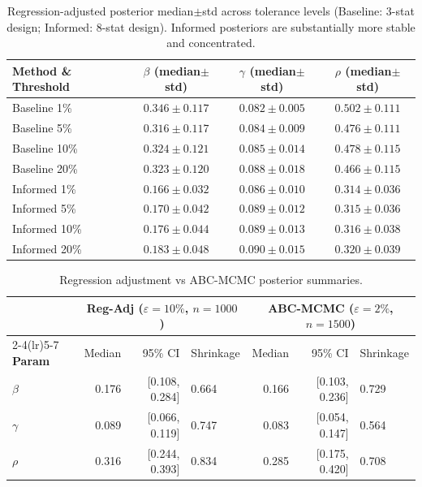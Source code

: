 \documentclass[12pt]{article}
\begin{document}
\begin{table}[h]
\centering
\small
\begin{tabular}{lccc}
\toprule
\textbf{Method \& Threshold} & \textbf{$\beta$ (median$\pm$std)} & \textbf{$\gamma$ (median$\pm$std)} & \textbf{$\rho$ (median$\pm$std)} \\
\midrule
Baseline 1\%  & $0.346\pm0.117$ & $0.082\pm0.005$ & $0.502\pm0.111$ \\
Baseline 5\%  & $0.316\pm0.117$ & $0.084\pm0.009$ & $0.476\pm0.111$ \\
Baseline 10\% & $0.324\pm0.121$ & $0.085\pm0.014$ & $0.478\pm0.115$ \\
Baseline 20\% & $0.323\pm0.120$ & $0.088\pm0.018$ & $0.466\pm0.115$ \\
\midrule
Informed 1\%  & $0.166\pm0.032$ & $0.086\pm0.010$ & $0.314\pm0.036$ \\
Informed 5\%  & $0.170\pm0.042$ & $0.089\pm0.012$ & $0.315\pm0.036$ \\
Informed 10\% & $0.176\pm0.044$ & $0.089\pm0.013$ & $0.316\pm0.038$ \\
Informed 20\% & $0.183\pm0.048$ & $0.090\pm0.015$ & $0.320\pm0.039$ \\
\bottomrule
\end{tabular}
\caption{Regression-adjusted posterior median$\pm$std across tolerance levels (Baseline: 3-stat design; Informed: 8-stat design). Informed posteriors are substantially more stable and concentrated.}
\label{tab:regadj_stability}
\end{table}

\begin{table}[h]
\centering
\small
\begin{tabular}{lrrlrrl}
\toprule
 & \multicolumn{3}{c}{\textbf{Reg-Adj} ($\varepsilon=10\%$, $n=1000$)} & \multicolumn{3}{c}{\textbf{ABC-MCMC} ($\varepsilon=2\%$, $n=1500$)} \\
\cmidrule(lr){2-4}\cmidrule(lr){5-7}
\textbf{Param} & Median & 95\% CI & Shrinkage & Median & 95\% CI & Shrinkage \\
\midrule
$\beta$ & 0.176 & [0.108, 0.284] & 0.664 & 0.166 & [0.103, 0.236] & 0.729 \\
$\gamma$ & 0.089 & [0.066, 0.119] & 0.747 & 0.083 & [0.054, 0.147] & 0.564 \\
$\rho$   & 0.316 & [0.244, 0.393] & 0.834 & 0.285 & [0.175, 0.420] & 0.708 \\
\bottomrule
\end{tabular}
\caption{Regression adjustment vs ABC-MCMC posterior summaries.}
\label{tab:reg_adj}
\end{table}
\end{document}
